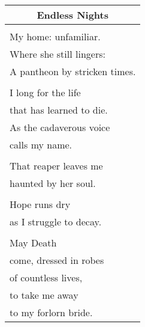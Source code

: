 \documentclass{article}
\begin{document}
\begin{center}
\begin{tabular}{l}
\multicolumn{1}{c}{\textbf{Endless Nights}} \\ \hline
\\
My home: unfamiliar. \\
Where she still lingers: \\
A pantheon by stricken times. \\
\\
I long for the life \\
that has learned to die. \\
As the cadaverous voice \\
calls my name. \\
\\
That reaper leaves me \\
haunted by her soul. \\
\\
Hope runs dry \\
as I struggle to decay. \\
\\
May Death \\
come, dressed in robes \\
of countless lives, \\
to take me away \\
to my forlorn bride. \\
\end{tabular}
\end{center}
\end{document}
